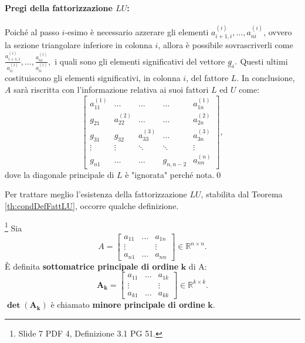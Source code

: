 \paragraph{Pregi della fattorizzazione $LU$:} Poiché al passo $i$-esimo è necessario azzerare gli elementi $a_{i+1,i}^{(i)}, \hdots, a_{ni}^{(i)}$, ovvero la sezione triangolare inferiore in colonna $i$, allora è possibile sovrascriverli come $\frac{a_{i+1,i}^{(i)}}{a_{ii}^{(i)}}, \hdots,\frac{a_{ni}^{(i)}}{a_{ii}^{(i)}},$ i quali sono gli elementi significativi del vettore $\uline g_i.$ Questi ultimi costituiscono gli elementi significativi, in colonna $i$, del fattore $L$.
In conclusione, $A$ sarà riscritta con l'informazione relativa ai suoi fattori $L$ ed $U$ come:
\begin{equation*}
    \begin{bmatrix}
        a_{11}^{(1)} &\hdots &\hdots &\hdots & a_{1n}^{(1)} \\
        g_{21} & a_{22}^{(2)} &\hdots &\hdots & a_{2n}^{(2)}\\
        g_{31} & g_{32} & a_{33}^{(3)} &\hdots & a_{3n}^{(3)}\\
        \vdots & \vdots & \ddots &\ddots & \vdots \\
        g_{n1} & \hdots & \hdots & g_{n, n-2} & a_{nn}^{(n)}
    \end{bmatrix},
\end{equation*}
dove la diagonale principale di $L$ è "ignorata" perché nota.\qed

Per trattare meglio l'esistenza della fattorizzazione $LU$, stabilita dal Teorema \ref{th:condDefFattLU}, occorre qualche definizione.

\begin{definition}\footnote{Slide 7 PDF 4, Definizione 3.1 PG 51.}
    Sia
    \begin{equation}
        A=
        \begin{bmatrix}
            a_{11} & \hdots & a_{1n}\\
            \vdots & & \vdots\\
            a_{n1} & \hdots & a_{nn}
        \end{bmatrix}\in\mathbb R^{n\times n}.
    \end{equation}
    È definita \textbf{sottomatrice principale di ordine} $\boldsymbol k$ di A:
    \begin{equation}
        \boldsymbol{A_k=}
        \begin{bmatrix}
            a_{11} & \hdots & a_{1k}\\
            \vdots & & \vdots\\
            a_{k1} & \hdots & a_{kk}
        \end{bmatrix}\in\mathbb R^{k\times k}.
    \end{equation}
    $\boldsymbol{\det(A_k)}$ è chiamato \textbf{minore principale di ordine} $\boldsymbol k$.
\end{definition}

